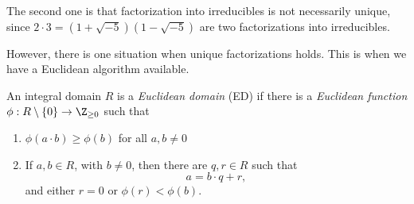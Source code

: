 \documentclass[a4paper]{article}
\begin{document}
The second one is that factorization into irreducibles is not necessarily unique, since $2\cdot 3 = (1 + \sqrt{-5})(1 - \sqrt{-5})$ are two factorizations into irreducibles.

However, there is one situation when unique factorizations holds. This is when we have a Euclidean algorithm available.

\begin{defi}
  An integral domain $R$ is a \emph{Euclidean domain} (ED) if there is a \emph{Euclidean function} $\phi: R\setminus \{0\} \to \Z_{\geq 0}$ such that
  \begin{enumerate}
    \item $\phi(a \cdot b) \geq \phi(b)$ for all $a, b \not= 0$
    \item If $a, b\in R$, with $b \not= 0$, then there are $q, r \in R$ such that
      \[
        a = b \cdot q + r,
      \]
     and either $r = 0$ or $\phi(r) < \phi(b)$.
  \end{enumerate}
\end{defi}
\end{document}
